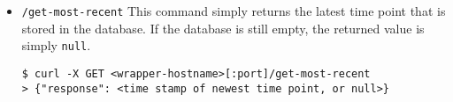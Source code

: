 \begin{itemize}
    \item \texttt{/get-most-recent}
    This command simply returns the latest time point that is stored in the database.
    If the database is still empty, the returned value is simply \texttt{null}.
    \begin{verbatim}
$ curl -X GET <wrapper-hostname>[:port]/get-most-recent
> {"response": <time stamp of newest time point, or null>}
    \end{verbatim}


\end{itemize}